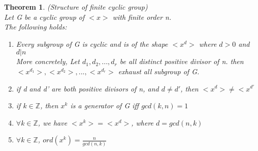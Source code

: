 \documentclass{article}
\newtheorem*{theorem}{Theorem}
\begin{document}
    \begin{theorem}
        (Structure of finite cyclic group)\\
        Let G be a cyclic group of \(<x>\) with finite order n.\\
        The following holds:
        \begin{enumerate}
            \item Every subgroup of G is cyclic and is of the shape \(<x^d>\)
            where \(d>0\) and \(d|n\)\\
            More concretely, Let \(d_1,d_2,...,d_r\) be all distinct positive divisor
            of n. then \(<x^{d_1}>,<x^{d_2}>,...,<x^{d_r}>\) exhaust all subgroup of G.
            \item if d and d' are both positive divisors of n, and \(d\neq d'\),
            then \(<x^d>\neq <x^{d'}\)
            \item if \(k \in \mathbb Z\), then \(x^k\) is a generator of G iff \(gcd(k,n)=1\)
            \item \(\forall k \in \mathbb Z\), we have \(<x^k>=<x^d>\), where \(d=gcd(n,k)\)
            \item \(\forall k \in \mathbb Z\), \(ord(x^k)=\frac{n}{gcd(n,k)}\)
        \end{enumerate}
    \end{theorem}
    
\end{document}
